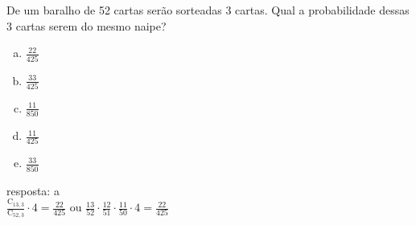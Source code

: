 \begin{ex}
 De um baralho de 52 cartas serão sorteadas 3 cartas. Qual a probabilidade dessas 3 cartas serem do mesmo naipe?
    \begin{enumerate}[(a)]
    \item $\frac{22}{425}$
    \item $\frac{33}{425}$
    \item $\frac{11}{850}$
    \item $\frac{11}{425}$
    \item $\frac{33}{850}$
    \end{enumerate}
      \begin{sol}
      resposta: a \\
      $\frac{\mathrm{C}_{{13},3}}{\mathrm{C}_{{52},3}}\cdot 4= \frac{22}{425}$\hspace{0.2cm} ou \hspace{0.2cm}$\frac{13}{52}\cdot\frac{12}{51}\cdot\frac{11}{50}\cdot4=\frac{22}{425}$
      \end{sol}
\end{ex}